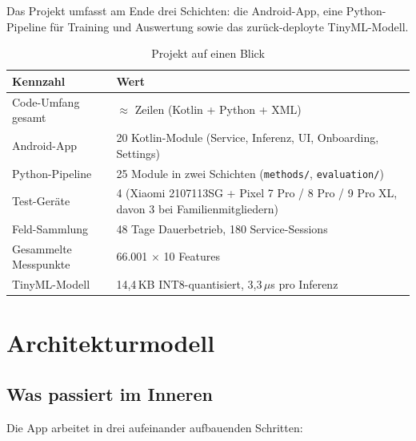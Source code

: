 \documentclass[12pt, a4paper, ngerman]{article}
\newcommand{\code}[1]{\texttt{#1}}
\begin{document}
Das Projekt umfasst am Ende drei Schichten: die Android-App, eine
Python-Pipeline für Training und Auswertung sowie das zurück-deployte
TinyML-Modell.

\begin{table}[H]
\centering
\caption{Projekt auf einen Blick}
\label{tab:eckdaten}
\small
\begin{tabular}{lp{9.5cm}}
\toprule
\textbf{Kennzahl} & \textbf{Wert} \\
\midrule
Code-Umfang gesamt        & $\approx$\;8.300 Zeilen (Kotlin + Python + XML) \\
Android-App               & 20 Kotlin-Module (Service, Inferenz, UI, Onboarding, Settings) \\
Python-Pipeline           & 25 Module in zwei Schichten (\code{methods/}, \code{evaluation/}) \\
Test-Geräte               & 4 (Xiaomi 2107113SG + Pixel 7 Pro / 8 Pro / 9 Pro XL, davon 3 bei Familienmitgliedern) \\
Feld-Sammlung             & 48 Tage Dauerbetrieb, 180 Service-Sessions \\
Gesammelte Messpunkte     & 66.001 $\times$ 10 Features \\
TinyML-Modell             & 14{,}4\,KB INT8-quantisiert, 3{,}3\,$\mu$s pro Inferenz \\
\bottomrule
\end{tabular}
\end{table}

\newpage

\section{Architekturmodell}
\label{sec:architektur}

\subsection{Was passiert im Inneren}
\label{sec:einordnung}

Die App arbeitet in drei aufeinander aufbauenden Schritten:
\end{document}
